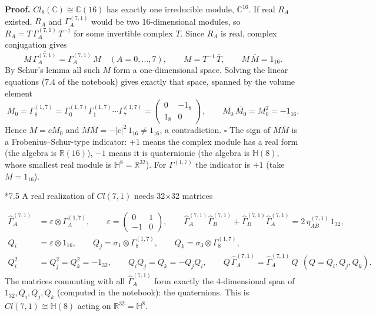 \documentclass[10pt,a4paper]{article}
\makeatletter
\renewcommand\subsection{\@startsection{subsection}{2}{\z@}{-3.25ex\@plus -1ex \@minus -.2ex}{1.5ex \@plus .2ex}{\normalfont\large\bfseries\raggedright}}
\makeatother
\begin{document}
\textbf{Proof.} $Cl_8(\mathbb C)\cong\mathbb C(16)$ has exactly one irreducible module, $\mathbb C^{16}$. If real $R_A$ existed, $R_A$ and $\Gamma^{(7,1)}_A$ would be two 16-dimensional modules, so $R_A=T\,\Gamma^{(7,1)}_A\,T^{-1}$ for some invertible complex $T$. Since $R_A$ is real, complex conjugation gives
\begin{equation*}
M\,\overline{\Gamma^{(7,1)}_A}=\Gamma^{(7,1)}_A\,M\quad(A=0,\dots,7),\qquad M=T^{-1}\,\overline{T},\qquad M\,\overline M=1_{16}.
\end{equation*}
By Schur's lemma all such $M$ form a one-dimensional space. Solving the linear equations (7.4 of the notebook) gives exactly that space, spanned by the volume element
\begin{equation*}
M_0=\Gamma^{(1,7)}_8=\Gamma^{(1,7)}_0\Gamma^{(1,7)}_1\cdots\Gamma^{(1,7)}_7=\begin{pmatrix}0&-1_8\\1_8&0\end{pmatrix},\qquad M_0\,\overline{M_0}=M_0^2=-1_{16}.
\end{equation*}
Hence $M=cM_0$ and $M\overline M=-|c|^2\,1_{16}\neq1_{16}$, a contradiction. $\square$ The sign of $M\overline M$ is a Frobenius–Schur-type indicator: $+1$ means the complex module has a real form (the algebra is $\mathbb R(16)$), $-1$ means it is quaternionic (the algebra is $\mathbb H(8)$, whose smallest real module is $\mathbb H^8=\mathbb R^{32}$). For $\Gamma^{(1,7)}$ the indicator is $+1$ (take $M=1_{16}$).

\subsection*{7.5 A real realization of \texorpdfstring{$Cl(7,1)$}{Cl(7,1)} needs 32×32 matrices}
\begin{align*}
\widehat\Gamma^{(7,1)}_A&=\varepsilon\otimes\Gamma^{(1,7)}_A,\qquad \varepsilon=\begin{pmatrix}0&1\\-1&0\end{pmatrix},\qquad \widehat\Gamma^{(7,1)}_A\widehat\Gamma^{(7,1)}_B+\widehat\Gamma^{(7,1)}_B\widehat\Gamma^{(7,1)}_A=2\,\eta^{(7,1)}_{AB}\,1_{32}, \\
Q_i&=\varepsilon\otimes1_{16},\qquad Q_j=\sigma_1\otimes\Gamma^{(1,7)}_8,\qquad Q_k=\sigma_3\otimes\Gamma^{(1,7)}_8, \\
Q_i^2&=Q_j^2=Q_k^2=-1_{32},\qquad Q_iQ_j=Q_k=-Q_jQ_i,\qquad Q\,\widehat\Gamma^{(7,1)}_A=\widehat\Gamma^{(7,1)}_A\,Q\ \ (Q=Q_i,Q_j,Q_k).
\end{align*}
The matrices commuting with all $\widehat\Gamma^{(7,1)}_A$ form exactly the 4-dimensional span of $1_{32},Q_i,Q_j,Q_k$ (computed in the notebook): the quaternions. This is $Cl(7,1)\cong\mathbb H(8)$ acting on $\mathbb R^{32}=\mathbb H^8$.
\end{document}
